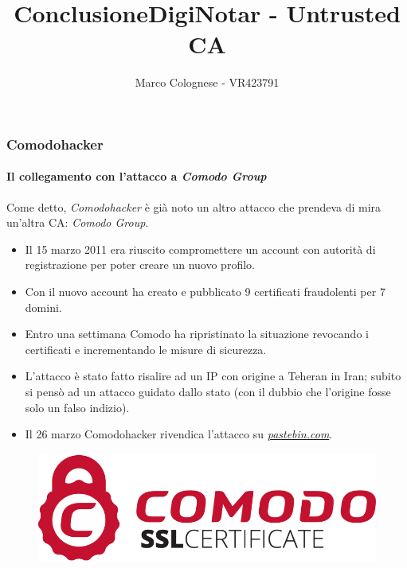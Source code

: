\documentclass{beamer}
\begin{document}
\begin{frame}
\frametitle{Comodohacker}
\framesubtitle{Il collegamento con l'attacco a \textit{Comodo Group}}
Come detto, \textit{Comodohacker} è già noto un altro attacco che prendeva di mira un'altra CA: \textit{Comodo Group}.
\begin{itemize}
	\item Il 15 marzo 2011 era riuscito \alert{compromettere un account} con autorità di registrazione per poter creare un nuovo profilo.
	\item Con il nuovo account ha \alert{creato} e pubblicato 9 \alert{certificati} fraudolenti per 7 domini.
	\item Entro una settimana Comodo ha \alert{ripristinato} la situazione revocando i certificati e incrementando le misure di sicurezza.
	\item L'attacco è stato fatto risalire ad un IP con origine a Teheran in Iran; subito si pensò ad un attacco guidato dallo stato (con il dubbio che l'origine fosse solo un falso indizio).
	\item Il 26 marzo \alert{Comodohacker} rivendica l'attacco su \href{https://pastebin.com/74KXCaEZ}{\alert{\textit{pastebin.com}}}.
\end{itemize}
\begin{figure}[H]
	\centering
	\includegraphics[scale=0.15]{comodo}
\end{figure}
\end{frame}


\title{Conclusione}
\subtitle{}
\institute{}
\author{}
\begin{frame}
\titlepage
\end{frame}
\title{DigiNotar - Untrusted CA}
\author{Marco Colognese - VR423791}
\end{document}
